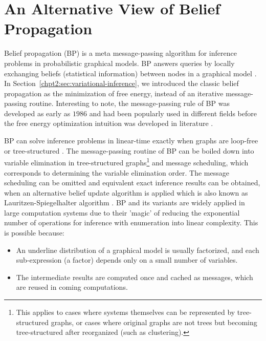 \chapter{An Alternative View of Belief Propagation}
\label{chapter3}
\graphicspath{{source/chapter3/}}

Belief propagation (BP) is a meta message-passing algorithm for inference problems in probabilistic graphical models. BP answers queries by locally exchanging beliefs (statistical information) between nodes in a graphical model \cite{kschischang2001factor_graph, Bishop:2006:PRM:1162264}. In Section~\ref{chpt2:sec:variational-inference}, we introduced the classic belief propagation as the minimization of free energy, instead of an iterative message-passing routine. Interesting to note, the message-passing rule of BP was developed as early as $1986$ \cite{pearl1986b} and had been popularly used in different fields before the free energy optimization intuition was developed in literature \cite{yedidia2003understanding}.

BP can solve inference problems in linear-time exactly when graphs are loop-free or tree-structured \cite{kschischang2001factor_graph}. The message-passing routine of BP can be boiled down into variable elimination in tree-structured graphs\footnote{This applies to cases where systems themselves can be represented by tree-structured graphs, or cases where original graphs are not trees but becoming tree-structured after reorganized (such as clustering).} and message scheduling, which corresponds to determining the variable elimination order. The message scheduling can be omitted and equivalent exact inference results can be obtained, when an alternative belief update algorithm is applied which is also known as Lauritzen-Spiegelhalter algorithm \cite[Section~10.3]{koller2009pgm}. BP and its variants are widely applied in large computation systems due to their 'magic' of reducing the exponential number of operations for inference with enumeration into linear complexity. This is possible because: 
\begin{itemize}
\item An underline distribution of a graphical model is usually factorized, and each sub-expression (a factor) depends only on a small number of variables.
\item The intermediate results are computed once and cached as messages, which are reused in coming computations. 
\end{itemize}

